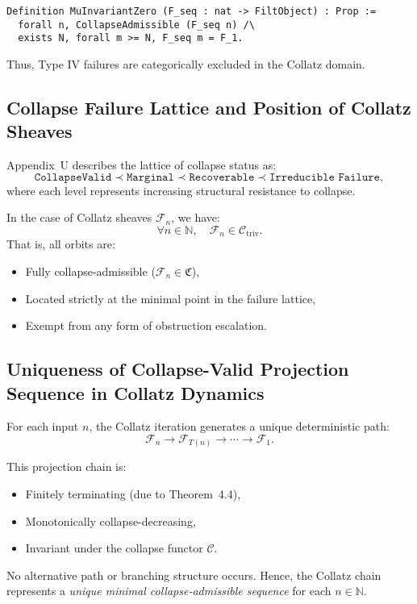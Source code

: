 \documentclass[11pt]{article}
\begin{document}
\begin{lstlisting}[language=Coq]
Definition MuInvariantZero (F_seq : nat -> FiltObject) : Prop :=
  forall n, CollapseAdmissible (F_seq n) /\
  exists N, forall m >= N, F_seq m = F_1.
\end{lstlisting}

Thus, Type IV failures are categorically excluded in the Collatz domain.

\subsection{Collapse Failure Lattice and Position of Collatz Sheaves}

Appendix~U describes the lattice of collapse status as:
\[
\texttt{CollapseValid} \prec \texttt{Marginal} \prec \texttt{Recoverable} \prec \texttt{Irreducible Failure},
\]
where each level represents increasing structural resistance to collapse.

In the case of Collatz sheaves \( \mathcal{F}_n \), we have:
\[
\forall n \in \mathbb{N}, \quad \mathcal{F}_n \in \mathcal{C}_{\mathrm{triv}}.
\]
That is, all orbits are:
\begin{itemize}
  \item Fully collapse-admissible (\( \mathcal{F}_n \in \mathfrak{C} \)),
  \item Located strictly at the minimal point in the failure lattice,
  \item Exempt from any form of obstruction escalation.
\end{itemize}

\subsection{Uniqueness of Collapse-Valid Projection Sequence in Collatz Dynamics}

For each input \( n \), the Collatz iteration generates a unique deterministic path:
\[
\mathcal{F}_n \to \mathcal{F}_{T(n)} \to \cdots \to \mathcal{F}_1.
\]

This projection chain is:
\begin{itemize}
  \item Finitely terminating (due to Theorem~4.4),
  \item Monotonically collapse-decreasing,
  \item Invariant under the collapse functor \( \mathcal{C} \).
\end{itemize}

No alternative path or branching structure occurs. Hence, the Collatz chain represents a \emph{unique minimal collapse-admissible sequence} for each \( n \in \mathbb{N} \).
\end{document}
